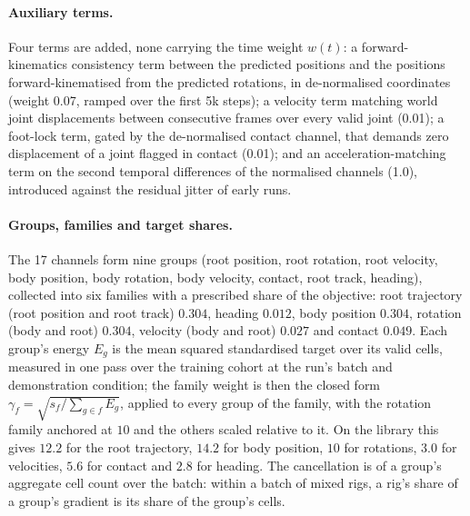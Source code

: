 \paragraph{Auxiliary terms.} Four terms are added, none carrying the time weight $w(t)$: a
forward-kinematics consistency term between the predicted positions and the positions
forward-kinematised from the predicted rotations, in de-normalised coordinates (weight 0.07, ramped
over the first 5k steps); a velocity term matching world joint displacements between consecutive
frames over every valid joint (0.01); a foot-lock term, gated by the de-normalised contact channel,
that demands zero displacement of a joint flagged in contact (0.01); and an acceleration-matching term
on the second temporal differences of the normalised channels (1.0), introduced against the
residual jitter of early runs.



\paragraph{Groups, families and target shares.} The 17 channels form nine groups (root position,
root rotation, root velocity, body position, body rotation, body velocity, contact, root track,
heading), collected into six families with a prescribed share of the objective: root trajectory
(root position and root track) $0.304$, heading $0.012$, body position $0.304$, rotation (body and
root) $0.304$, velocity (body and root) $0.027$ and contact $0.049$. Each group's energy
$E_g$ is the mean squared standardised target over its valid cells, measured in one pass over the
training cohort at the run's batch and demonstration condition; the family weight is then the closed
form $\gamma_f=\sqrt{s_f/\sum_{g\in f}E_g}$, applied to every group of the family, with the rotation family
anchored at $10$ and the others scaled relative to it. On the library this gives $12.2$ for the root trajectory, $14.2$ for body
position, $10$ for rotations, $3.0$ for velocities, $5.6$ for contact and $2.8$ for heading. The cancellation is of
a group's aggregate cell count over the batch: within a batch of mixed rigs, a rig's share of a group's gradient is
its share of the group's cells.

